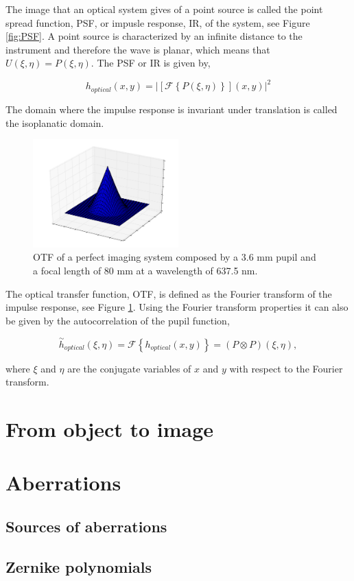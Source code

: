 The image that an optical system gives of a point source is called the point spread function, PSF, or impusle response, IR, of the system, see Figure \ref{fig:PSF}. A point source is characterized by an infinite distance to the instrument and therefore the wave is planar, which means that $U(\xi,\eta) = P(\xi,\eta)$. The PSF or IR is given by,

\begin{equation}
h_{optical}(x,y) = |\left[\mathcal{F}\left\lbrace P(\xi,\eta) \right\rbrace\right](x,y)|^2
\label{eqt:impulseResponse}
\end{equation}

The domain where the impulse response is invariant under translation is called the isoplanatic domain.

\begin{figure}
\begin{center}
\includegraphics[width=0.5\textwidth,angle=0]{Figures/OTF}
\decoRule
\caption{OTF of a perfect imaging system composed by a 3.6 mm pupil and a focal length of 80 mm at a wavelength of 637.5 nm.}
\label{fig:OTF}
\end{center}
\end{figure}

The optical transfer function, OTF, is defined as the Fourier transform of the impulse response, see Figure \ref{fig:OTF}. Using the Fourier transform properties it can also be given by the autocorrelation of the pupil function,

\begin{equation}
\overset{\sim}{h}_{optical}(\xi,\eta) = \mathcal{F}\left\lbrace h_{optical}(x,y)\right\rbrace = (P \otimes P)(\xi,\eta),
\label{eqt:OTF}
\end{equation}

where $\xi$ and $\eta$ are the conjugate variables of $x$ and $y$ with respect to the Fourier transform.

\section{From object to image}
\label{sec:FromOtoI}



\section{Aberrations}
\label{sec:Aberrations}

\subsection{Sources of aberrations}
\label{subsec:SourcesAb}

\subsection{Zernike polynomials}
\label{subsec:ZernikePol}